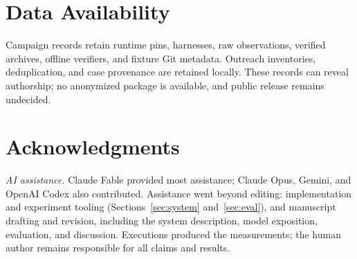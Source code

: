 \section*{Data Availability}
Campaign records retain runtime pins, harnesses, raw observations, verified
archives, offline verifiers, and fixture Git metadata. Outreach inventories,
deduplication, and case provenance are retained locally. These records can
reveal authorship; no anonymized package is available, and public release
remains undecided.

\section*{Acknowledgments}
\noindent\textit{AI assistance.}
Claude Fable provided most assistance; Claude Opus, Gemini, and OpenAI Codex
also contributed. Assistance went beyond editing: implementation and experiment
tooling (Sections~\ref{sec:system} and~\ref{sec:eval}), and manuscript drafting
and revision, including the system description, model exposition, evaluation,
and discussion. Executions produced the measurements; the human author
remains responsible for all claims and results.

